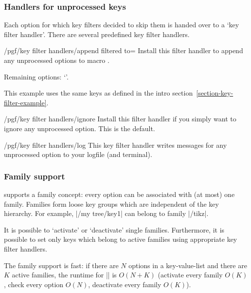 \subsubsection{Handlers for unprocessed keys}
Each option for which key filters decided to skip them is handed over to a `key filter handler'. There are several predefined key filter handlers.

\begin{key}{/pgf/key filter handlers/append filtered to=}
	Install this filter handler to append any unprocessed options to macro .
\begin{codeexample}[]
\def\remainingoptions{}

Remaining options: `\remainingoptions'.
\end{codeexample}
	This example uses the same keys as defined in the intro section~\ref{section-key-filter-example}.
\end{key}

\begin{key}{/pgf/key filter handlers/ignore}
	Install this filter handler if you simply want to ignore any unprocessed option. This is the default.
\end{key}

\begin{key}{/pgf/key filter handlers/log}
	This key filter handler writes messages for any unprocessed option to your logfile (and terminal).
\end{key}


\subsubsection{Family support}
\pgfname supports a family concept: every option can be associated with (at most) one family. Families form loose key groups which are independent of the key hierarchy. For example, |/my tree/key1| can belong to family |/tikz|.

It is possible to `activate' or `deactivate' single families. Furthermore, it is possible to set only keys which belong to active families using appropriate key filter handlers.

The family support is fast: if there are $N$ options in a key-value-list and there are $K$ active families, the runtime for |\pgfkeysfiltered| is $O(N+K)$ (activate every family $O(K)$, check every option $O(N)$, deactivate every family $O(K)$).

